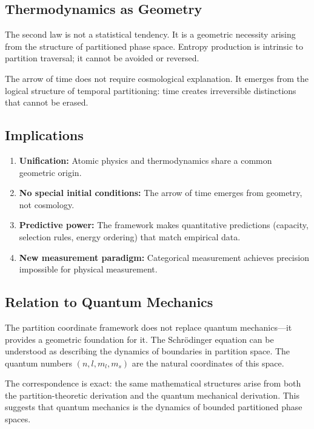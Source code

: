 \documentclass[twocolumn,10pt,a4paper]{article}
\theoremstyle{definition}
\theoremstyle{remark}
\begin{document}
\subsection{Thermodynamics as Geometry}

The second law is not a statistical tendency. It is a geometric necessity arising from the structure of partitioned phase space. Entropy production is intrinsic to partition traversal; it cannot be avoided or reversed.

The arrow of time does not require cosmological explanation. It emerges from the logical structure of temporal partitioning: time creates irreversible distinctions that cannot be erased.

\subsection{Implications}

\begin{enumerate}
    \item \textbf{Unification:} Atomic physics and thermodynamics share a common geometric origin.

    \item \textbf{No special initial conditions:} The arrow of time emerges from geometry, not cosmology.

    \item \textbf{Predictive power:} The framework makes quantitative predictions (capacity, selection rules, energy ordering) that match empirical data.

    \item \textbf{New measurement paradigm:} Categorical measurement achieves precision impossible for physical measurement.
\end{enumerate}

\subsection{Relation to Quantum Mechanics}

The partition coordinate framework does not replace quantum mechanics---it provides a geometric foundation for it. The Schr\"{o}dinger equation can be understood as describing the dynamics of boundaries in partition space. The quantum numbers $(n, l, m_l, m_s)$ are the natural coordinates of this space.

The correspondence is exact: the same mathematical structures arise from both the partition-theoretic derivation and the quantum mechanical derivation. This suggests that quantum mechanics is the dynamics of bounded partitioned phase spaces.
\end{document}
